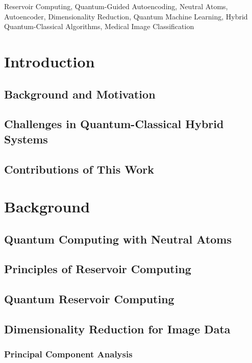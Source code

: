 \documentclass[conference]{IEEEtran}
\begin{document}
\begin{IEEEkeywords}
Reservoir Computing, Quantum-Guided Autoencoding,
Neutral Atoms, Autoencoder, Dimensionality Reduction, 
Quantum Machine Learning, Hybrid Quantum-Classical Algorithms, 
Medical Image Classification
\end{IEEEkeywords}


\section{Introduction}
\subsection{Background and Motivation}
\subsection{Challenges in Quantum-Classical Hybrid Systems}
\subsection{Contributions of This Work}

\section{Background}
\subsection{Quantum Computing with Neutral Atoms}
\subsection{Principles of Reservoir Computing}
\subsection{Quantum Reservoir Computing}
\subsection{Dimensionality Reduction for Image Data}
\subsubsection{Principal Component Analysis}
\end{document}
